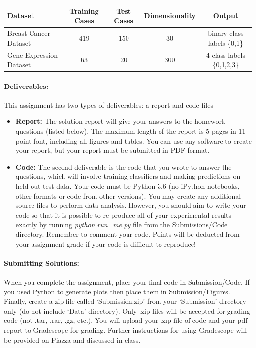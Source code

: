 \documentclass[letterpaper]{article}
\begin{document}
\begin{table}[h!]
\center
\begin{tabular}{|l|c|c|c|c|}\hline
Dataset & Training Cases & Test Cases & Dimensionality & Output \\\hline\hline
Breast Cancer Dataset & 419 & 150 & 30 & binary class labels \{0,1\} \\\hline
Gene Expression Dataset & 63 & 20 & 300 & 4-class labels \{0,1,2,3\}\\\hline\hline
\end{tabular}
\end{table}

\paragraph*{Deliverables:} This assignment has two types of deliverables: a report and code files
\begin{itemize}
\item \textbf{Report: } The solution report will give your answers to the homework questions (listed below). The maximum length of the report is 5 pages in 11 point font, including all figures and tables. You can use any software to create your report, but your report must be submitted in PDF format. 

\item \textbf{Code: } The second deliverable is the code that you wrote to answer the questions, which will involve training classifiers and making predictions on held-out test data. Your code must be Python 3.6 (no iPython notebooks, other formats or code from other versions). You may create any additional source files to perform data analysis. However, you should aim to write your code so that it is possible to re-produce all of your experimental results exactly by running \textit{python run\_me.py} file from the Submissions/Code directory. Remember to comment your code. Points will be deducted from your assignment grade if your code is difficult to reproduce!

\end{itemize}


\paragraph*{Submitting Solutions:} When you complete the assignment, place your final code in Submission/Code. If you used Python to generate plots then place them in Submission/Figures. Finally, create a zip file called `Submission.zip' from your `Submission' directory only (do not include `Data' directory). Only .zip files will be accepted for grading code (not .tar, .rar, .gz, etc.). You will upload your .zip file of code and your pdf report to Gradescope for grading. Further instructions for using Gradescope will be provided on Piazza and discussed in class.
\end{document}
